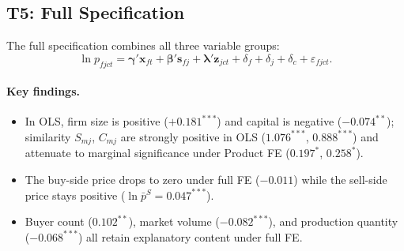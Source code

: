 \documentclass[12pt]{article}
\begin{document}
\subsection{T5: Full Specification}
\label{sec:t5}

The full specification combines all three variable groups:
\begin{equation}
  \ln p_{fjct}
  = \boldsymbol{\gamma}' \mathbf{x}_{ft}
  + \boldsymbol{\beta}' \mathbf{s}_{fj}
  + \boldsymbol{\lambda}' \mathbf{z}_{jct}
  + \delta_f + \delta_j + \delta_c
  + \varepsilon_{fjct}.
  \label{eq:t5}
\end{equation}

\paragraph{Key findings.}
\begin{itemize}[leftmargin=1.5em,nosep]
  \item In OLS, firm size is positive (\(+0.181^{***}\)) and capital is negative
    (\(-0.074^{**}\)); similarity \(S_{mj}\), \(C_{mj}\) are strongly positive in
    OLS (\(1.076^{***}\), \(0.888^{***}\)) and attenuate to marginal
    significance under Product FE (\(0.197^{*}\), \(0.258^{*}\)).
  \item The buy-side price drops to zero under full FE (\(-0.011\)) while the
    sell-side price stays positive (\(\ln\bar{p}^{S}=0.047^{***}\)).
  \item Buyer count (\(0.102^{**}\)), market volume (\(-0.082^{***}\)), and
    production quantity (\(-0.068^{***}\)) all retain explanatory content under
    full FE.
\end{itemize}
\end{document}
